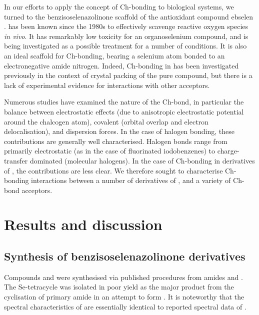 \begin{refsection}
    In our efforts to apply the concept of Ch-bonding to biological systems, we turned to the benzisoselenazolinone scaffold of the antioxidant compound ebselen .
     has been known since the 1980s to effectively scavenge reactive oxygen species \emph{in vivo}.\autocite{Muller1984}
    It has remarkably low toxicity for an organoselenium compound, and is being investigated as a possible treatment for a number of conditions.\autocite{Schewe1995,Kil2007,Singh2013,Parnham2000}
    It is also an ideal scaffold for Ch-bonding, bearing a selenium atom bonded to an electronegative amide nitrogen.
    Indeed, Ch-bonding in  has been investigated previously in the context of crystal packing of the pure compound, but there is a lack of experimental evidence for interactions with other acceptors.\autocite{Thomas2015}
    
    Numerous studies have examined the nature of the Ch-bond, in particular the balance between electrostatic effects (due to anisotropic electrostatic potential around the chalcogen atom), covalent (orbital overlap and electron delocalisation), and dispersion forces.\autocite{Oliveira2017,Pascoe2017,DeVleeschouwer2017,Kolar2016,Gleiter2018}
    In the case of halogen bonding, these contributions are generally well characterised.
    Halogen bonds range from primarily electrostatic (as in the case of fluorinated iodobenzenes\autocite{Prasang2009}) to charge-transfer dominated (molecular halogens\autocite{Mulliken1950}).
    In the case of Ch-bonding in derivatives of , the contributions are less clear.
    We therefore sought to characterise Ch-bonding interactions between a number of derivatives of , and a variety of Ch-bond acceptors.
    
    
    \section{Results and discussion}
    \subsection[Synthesis of \refcmpd{ebs,ebs.bn,tetracycle}]{Synthesis of benzisoselenazolinone derivatives }
    Compounds  and  were synthesised via published procedures from amides  and .\autocite{Bhabak2010}
    The Se-tetracycle  was isolated in poor yield as the major product from the cyclisation of primary amide  in an attempt to form .
    It is noteworthy that the spectral characteristics of  are essentially identical to reported spectral data of \autocite{Bhabak2010}.
    

\end{refsection}
